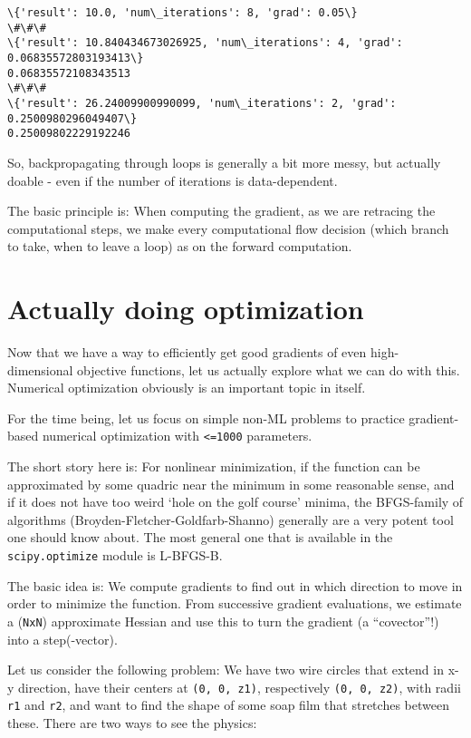 \documentclass[11pt]{article}
\begin{document}
    \begin{Verbatim}[commandchars=\\\{\}]
\{'result': 10.0, 'num\_iterations': 8, 'grad': 0.05\}
\#\#\#
\{'result': 10.840434673026925, 'num\_iterations': 4, 'grad': 0.06835572803193413\}
0.06835572108343513
\#\#\#
\{'result': 26.24009900990099, 'num\_iterations': 2, 'grad': 0.2500980296049407\}
0.25009802229192246
    \end{Verbatim}

    So, backpropagating through loops is generally a bit more messy, but
actually doable - even if the number of iterations is data-dependent.

The basic principle is: When computing the gradient, as we are retracing
the computational steps, we make every computational flow decision
(which branch to take, when to leave a loop) as on the forward
computation.

    \hypertarget{actually-doing-optimization}{%
\section{Actually doing
optimization}\label{actually-doing-optimization}}

Now that we have a way to efficiently get good gradients of even
high-dimensional objective functions, let us actually explore what we
can do with this. Numerical optimization obviously is an important topic
in itself.

For the time being, let us focus on simple non-ML problems to practice
gradient-based numerical optimization with \texttt{\textless{}=1000}
parameters.

The short story here is: For nonlinear minimization, if the function can
be approximated by some quadric near the minimum in some reasonable
sense, and if it does not have too weird `hole on the golf course'
minima, the BFGS-family of algorithms (Broyden-Fletcher-Goldfarb-Shanno)
generally are a very potent tool one should know about. The most general
one that is available in the \texttt{scipy.optimize} module is L-BFGS-B.

The basic idea is: We compute gradients to find out in which direction
to move in order to minimize the function. From successive gradient
evaluations, we estimate a (\texttt{NxN}) approximate Hessian and use
this to turn the gradient (a ``covector''!) into a step(-vector).

Let us consider the following problem: We have two wire circles that
extend in x-y direction, have their centers at \texttt{(0,\ 0,\ z1)},
respectively \texttt{(0,\ 0,\ z2)}, with radii \texttt{r1} and
\texttt{r2}, and want to find the shape of some soap film that stretches
between these. There are two ways to see the physics:
\end{document}
